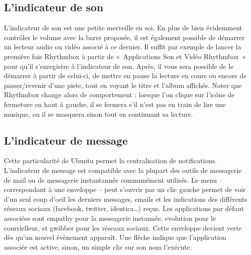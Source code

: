\subsection{L'indicateur de son}
L'indicateur de son est une petite merveille en soi. En plus de bien évidemment contrôler le volume avec la barre proposée, il est également possible de démarrer un lecteur audio ou vidéo associé à ce dernier. Il suffit par exemple de lancer la première fois Rhythmbox à partir de «~Applications \FlecheDroite Son et Vidéo \FlecheDroite Rhythmbox~» pour qu'il s'enregistre à l'indicateur de son. Après, il vous sera possible de le démarrer à partir de celui-ci, de mettre en pause la lecture en cours ou encore de passer/revenir d'une piste, tout en voyant le titre et l'album affichés. Noter que Rhythmbox change alors de comportement : lorsque l'on clique sur l'icône de fermeture en haut à gauche, il se fermera s'il n'est pas en train de lire une musique, ou il se masquera sinon tout en continuant sa lecture.
\subsection{L'indicateur de message}
Cette particularité de Ubuntu permet la centralisation de notifications. L'indicateur de message est compatible avec la plupart des outils de messagerie de mail ou de messagerie instantannée communément utilisés. Le menu -- correspondant à une enveloppe -- peut s'ouvrir par un clic gauche permet de voir d'un seul coup d'oeil les derniers messages, emails et les indications des différents réseaux sociaux (facebook, twitter, identica\dots{}) reçus. Les applications par défaut associées sont empathy pour la messagerie instannée, evolution pour le courrielleur, et gwibber pour les réseaux sociaux. Cette enveloppe devient verte dès qu'un nouvel évènement apparaît. Une flèche indique que l'application associée est active, sinon, un simple clic sur son nom l'exécute.
